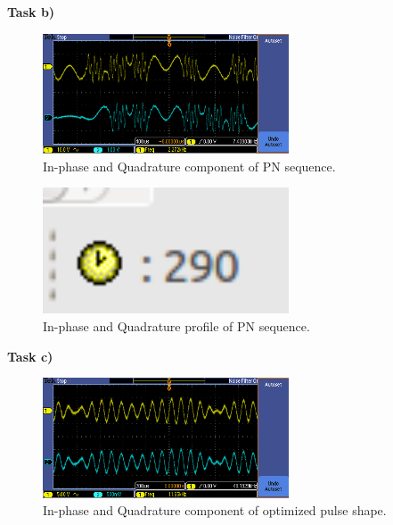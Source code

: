 \documentclass{article}
\begin{document}
\pagebreak
\textbf{Task b)}

\begin{figure}[h]
  \begin{center}
    \includegraphics[width=0.65\textwidth]{img/task_b_oscilloscope.png}
    \caption{In-phase and Quadrature component of PN sequence.}
  \end{center}
\end{figure}

\begin{figure}[h]
  \begin{center}
    \includegraphics[width=0.65\textwidth]{img/task_b_profile.png}
    \caption{In-phase and Quadrature profile of PN sequence.}
  \end{center}
\end{figure}

\pagebreak
\textbf{Task c)}

\begin{figure}[h]
  \begin{center}
    \includegraphics[width=0.65\textwidth]{img/task_c_oscilloscope.png}
    \caption{In-phase and Quadrature component of optimized pulse shape.}
  \end{center}
\end{figure}
\end{document}
